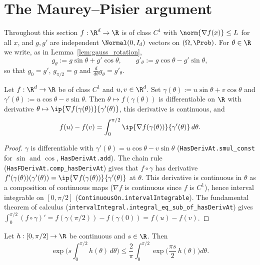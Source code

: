\section{The Maurey--Pisier argument}
\label{sec:pre_concentration_mp}

Throughout this section $f : \R^d \to \R$ is of class $C^1$ with $\norm{\nabla f(x)} \le L$
for all $x$, and $g, g'$ are independent $\Normal(0,I_d)$ vectors on $(\Omega,\Prob)$. For
$\theta \in \R$ we write, as in Lemma~\ref{lem:gauss_rotation},
\[
  g_\theta := g\sin\theta + g'\cos\theta, \qquad g'_\theta := g\cos\theta - g'\sin\theta,
\]
so that $g_0 = g'$, $g_{\pi/2} = g$ and $\frac{d}{d\theta}g_\theta = g'_\theta$.

\begin{lemma}\label{lem:pc_interpolation_ftc}
\leanok
Let $f : \R^d \to \R$ be of class $C^1$ and $u, v \in \R^d$. Set
$\gamma(\theta) := u\sin\theta + v\cos\theta$ and $\gamma'(\theta) := u\cos\theta - v\sin\theta$.
Then $\theta \mapsto f(\gamma(\theta))$ is differentiable on $\R$ with derivative
$\theta \mapsto \ip{\nabla f(\gamma(\theta))}{\gamma'(\theta)}$, this derivative is continuous,
and
\[
  f(u) - f(v) = \int_0^{\pi/2}\ip{\nabla f(\gamma(\theta))}{\gamma'(\theta)}\,d\theta .
\]
\end{lemma}

\begin{proof}
\leanok
$\gamma$ is differentiable with $\gamma'(\theta) = u\cos\theta - v\sin\theta$
(\texttt{HasDerivAt.smul\_const} for $\sin$ and $\cos$, \texttt{HasDerivAt.add}). The chain
rule (\texttt{HasFDerivAt.comp\_hasDerivAt}) gives that $f\circ\gamma$ has derivative
$f'(\gamma(\theta))(\gamma'(\theta)) = \ip{\nabla f(\gamma(\theta))}{\gamma'(\theta)}$ at
$\theta$. This derivative is continuous in $\theta$ as a composition of continuous maps
($\nabla f$ is continuous since $f$ is $C^1$), hence interval integrable on $[0,\pi/2]$
(\texttt{ContinuousOn.intervalIntegrable}). The fundamental theorem of calculus
(\texttt{intervalIntegral.integral\_eq\_sub\_of\_hasDerivAt}) gives
$\int_0^{\pi/2}(f\circ\gamma)' = f(\gamma(\pi/2)) - f(\gamma(0)) = f(u) - f(v)$.
\end{proof}

\begin{lemma}
\label{lem:pc_jensen_exp_average}
\leanok
Let $h : [0,\pi/2] \to \R$ be continuous and $s \in \R$. Then
\[
  \exp\Big(s\int_0^{\pi/2}h(\theta)\,d\theta\Big)
  \le \frac2\pi\int_0^{\pi/2}\exp\Big(\frac{\pi s}{2}\,h(\theta)\Big)d\theta .
\]
\end{lemma}

